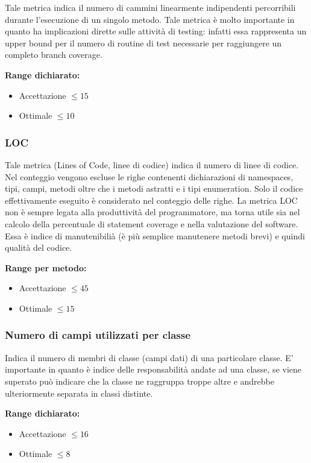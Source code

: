 Tale metrica indica il numero di cammini linearmente indipendenti percorribili durante
l'esecuzione di un singolo metodo. Tale metrica è molto importante in quanto ha
implicazioni dirette sulle attività di testing: infatti essa rappresenta un upper bound
per il numero di routine di test necessarie per raggiungere un completo branch coverage.

\textbf{Range dichiarato:}
\begin{itemize}
\item Accettazione $\leq 15$
\item Ottimale $\leq 10$
\end{itemize}

\subsubsection{LOC}

Tale metrica (Lines of Code, linee di codice) indica il numero di linee di codice. Nel conteggio vengono escluse le righe contenenti dichiarazioni di namespaces, tipi, campi, metodi oltre che i metodi astratti e i tipi enumeration.
Solo il codice effettivamente eseguito è considerato nel conteggio delle righe.
La metrica LOC non è sempre legata alla produttività del programmatore, ma torna
utile sia nel calcolo della percentuale di statement coverage e nella valutazione del
software.
Essa è indice di manutenibilià (è più semplice manutenere metodi brevi) e quindi
qualità del codice.

\textbf{Range per metodo:}
\begin{itemize}
\item Accettazione $\leq 45$
\item Ottimale $\leq 15$
\end{itemize}

\subsubsection{Numero di campi utilizzati per classe}

Indica il numero di membri di classe (campi dati) di una particolare classe. E'
importante in quanto è indice delle responsabilità andate ad una classe, se viene
superato può indicare che la classe ne raggruppa troppe altre e andrebbe ulteriormente
separata in classi distinte.

\textbf{Range dichiarato:}
\begin{itemize}
\item Accettazione $\leq 16$
\item Ottimale $\leq 8$
\end{itemize}

